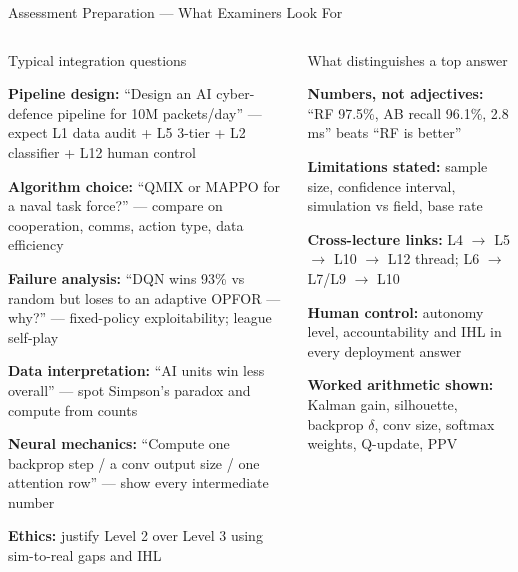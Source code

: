 \documentclass[aspectratio=169,10pt,t]{beamer}
\begin{document}
\begin{frame}{Assessment Preparation --- What Examiners Look For}
\begin{columns}[T]
\begin{cbox}{Typical integration questions}\scriptsize\begin{tl}\item \textbf{Pipeline design:} ``Design an AI cyber-defence pipeline for 10M packets/day'' --- expect L1 data audit + L5 3-tier + L2 classifier + L12 human control\item \textbf{Algorithm choice:} ``QMIX or MAPPO for a naval task force?'' --- compare on cooperation, comms, action type, data efficiency\item \textbf{Failure analysis:} ``DQN wins 93\% vs random but loses to an adaptive OPFOR --- why?'' --- fixed-policy exploitability; league self-play\item \textbf{Data interpretation:} ``AI units win less overall'' --- spot Simpson's paradox and compute from counts\item \textbf{Neural mechanics:} ``Compute one backprop step / a conv output size / one attention row'' --- show every intermediate number\item \textbf{Ethics:} justify Level 2 over Level 3 using sim-to-real gaps and IHL\end{tl}\end{cbox}
\begin{cbox}[ISSAgrn]{What distinguishes a top answer}\scriptsize\begin{tl}\item \textbf{Numbers, not adjectives:} ``RF 97.5\%, AB recall 96.1\%, 2.8 ms'' beats ``RF is better''\item \textbf{Limitations stated:} sample size, confidence interval, simulation vs field, base rate\item \textbf{Cross-lecture links:} L4 $\to$ L5 $\to$ L10 $\to$ L12 thread; L6 $\to$ L7/L9 $\to$ L10\item \textbf{Human control:} autonomy level, accountability and IHL in every deployment answer\item \textbf{Worked arithmetic shown:} Kalman gain, silhouette, backprop $\delta$, conv size, softmax weights, Q-update, PPV\end{tl}\end{cbox}
\end{columns}
\end{frame}
\end{document}
